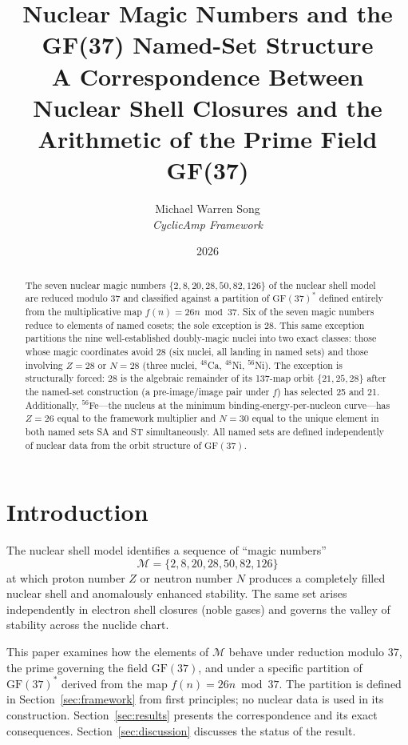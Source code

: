 \documentclass[11pt]{article}
\title{\textbf{Nuclear Magic Numbers and the GF(37) Named-Set Structure}\\[6pt]
\large A Correspondence Between Nuclear Shell Closures and the Arithmetic of the Prime Field GF(37)}
\author{Michael Warren Song\\
\textit{CyclicAmp Framework}}
\date{2026}
\theoremstyle{remark}
\begin{document}
\maketitle

\begin{abstract}
The seven nuclear magic numbers $\{2,8,20,28,50,82,126\}$ of the nuclear shell model
are reduced modulo 37 and classified against a partition of $\mathrm{GF}(37)^*$ defined
entirely from the multiplicative map $f(n)=26n\bmod 37$. Six of the seven magic numbers
reduce to elements of named cosets; the sole exception is 28. This same exception
partitions the nine well-established doubly-magic nuclei into two exact classes:
those whose magic coordinates avoid 28 (six nuclei, all landing in named sets) and
those involving $Z=28$ or $N=28$ (three nuclei, ${}^{48}$Ca, ${}^{48}$Ni, ${}^{56}$Ni).
The exception is structurally forced: 28 is the algebraic remainder of its
137-map orbit $\{21,25,28\}$ after the named-set construction (a pre-image/image pair
under $f$) has selected 25 and 21. Additionally, ${}^{56}$Fe---the nucleus at the
minimum binding-energy-per-nucleon curve---has $Z=26$ equal to the framework multiplier
and $N=30$ equal to the unique element in both named sets SA and ST simultaneously.
All named sets are defined independently of nuclear data from the orbit structure of
$\mathrm{GF}(37)$.
\end{abstract}

\section{Introduction}

The nuclear shell model \cite{goeppert1949,haxel1949} identifies a sequence of
``magic numbers''
\[
  \mathcal{M} = \{2,8,20,28,50,82,126\}
\]
at which proton number $Z$ or neutron number $N$ produces a completely filled nuclear
shell and anomalously enhanced stability. The same set arises independently in electron
shell closures (noble gases) and governs the valley of stability across the nuclide chart.

This paper examines how the elements of $\mathcal{M}$ behave under reduction modulo 37,
the prime governing the field $\mathrm{GF}(37)$, and under a specific partition of
$\mathrm{GF}(37)^*$ derived from the map $f(n)=26n\bmod 37$. The partition is defined
in Section~\ref{sec:framework} from first principles; no nuclear data is used in its
construction. Section~\ref{sec:results} presents the correspondence and its exact
consequences. Section~\ref{sec:discussion} discusses the status of the result.
\end{document}
